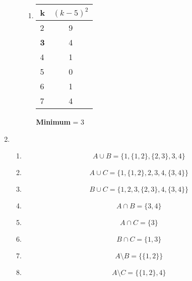\documentclass[a4paper]{article}
\begin{document}
\begin{enumerate}
\begin{enumerate}
\begin{enumerate}
				\item
				\begin{center}
					\begin{tabular}{|l|c|}
						\firsthline
							k & $(k - 5)^{2}$ \\
						\hline
							2 & 9 \\
							\textbf{3} & 4 \\
							4 & 1 \\
							5 & 0 \\
							6 & 1 \\
							7 & 4 \\
						\hline
					\end{tabular}
					\newline
					\textbf{Minimum} = 3
				\end{center}
			\end{enumerate}
		\end{enumerate}
		
		\item
		\begin{enumerate}
			\item
			\begin{equation*}
				A \cup B = \{1, \{1, 2\}, \{2, 3\}, 3, 4\}
			\end{equation*}
			\item
			\begin{equation*}
				A \cup C = \{1, \{1, 2\}, 2, 3, 4, \{3, 4\}\}
			\end{equation*}
			\item
			\begin{equation*}
				B \cup C = \{1, 2, 3, \{2, 3\}, 4, \{3, 4\}\}
			\end{equation*}
			
			\item
			\begin{equation*}
				A \cap B = \{3, 4\}
			\end{equation*}
			\item
			\begin{equation*}
				A \cap C = \{3\}
			\end{equation*}
			\item
			\begin{equation*}
				B \cap C = \{1, 3\}
			\end{equation*}
			
			\item
			\begin{equation*}
				A \text{\textbackslash} B = \{\{1, 2\}\}
			\end{equation*}
			\item
			\begin{equation*}
				A \text{\textbackslash} C = \{\{1, 2\}, 4\}
			\end{equation*}
			

\end{enumerate}
\end{enumerate}
\end{document}
